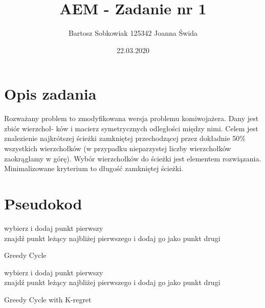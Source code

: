 \documentclass{article}
\title{AEM - Zadanie nr 1}
\author{Bartosz Sobkowiak 125342 Joanna Świda}
\date{22.03.2020}
\begin{document}
\maketitle
\section{Opis zadania}

    Rozważany problem to zmodyfikowana wersja problemu komiwojażera. Dany jest zbiór wierzchoł-
    ków i macierz symetrycznych odległości między nimi. Celem jest znalezienie najkrótszej ścieżki zamkniętej przechodzącej przez dokładnie 50\% wszystkich wierzchołków (w przypadku nieparzystej liczby wierzchołków zaokrąglamy w górę). Wybór wierzchołków do ścieżki jest elementem rozwiązania. Minimalizowane kryterium to długość zamkniętej ścieżki.
    


\section{Pseudokod}

\begin{algorithm}[H]
     
    wybierz i dodaj punkt pierwszy\\
    znajdź punkt leżący najbliżej pierwszego i dodaj go jako punkt drugi\\
\caption{Greedy Cycle}
\end{algorithm}

\vspace{10mm}

\begin{algorithm}[H]
     
    wybierz i dodaj punkt pierwszy\\
    znajdź punkt leżący najbliżej pierwszego i dodaj go jako punkt drugi\\
\caption{Greedy Cycle with K-regret}
\end{algorithm}
\end{document}
